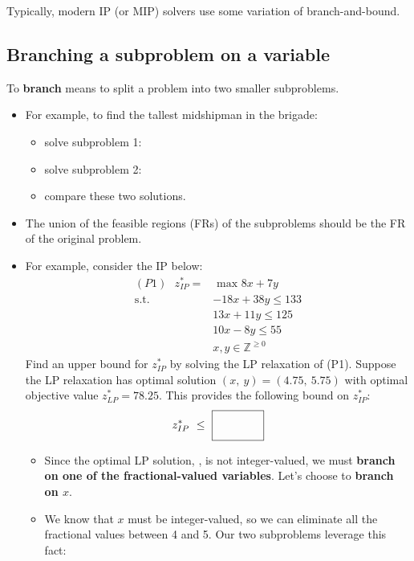 \documentclass[11pt]{article}
\theoremstyle{definition}
\newcommand{\answerbox}[3]{%
  \fbox{%
    \begin{minipage}[#1]{#2}
      \hfill\vspace{#3}
    \end{minipage}
  }
}
\newcommand{\wordbox}{\answerbox{c}{1.2in}{.7cm}}
\newcommand{\catbox}{\answerbox{c}{.5in}{.7cm}}
\begin{document}
Typically, modern IP (or MIP) solvers use some variation of branch-and-bound.
\vfill
\newpage
\subsection{Branching a subproblem on a variable}

To \textbf{branch} means to split a problem into two smaller subproblems. 

\begin{itemize}
\item For example, to find the tallest midshipman in the brigade:
\begin{itemize}
\item solve subproblem 1:  \answerbox{c}{10cm}{.7cm}
\item solve subproblem 2:  \answerbox{c}{10cm}{.7cm}
\item compare these two solutions.
\end{itemize}

\item  The union of the feasible regions (FRs) of the subproblems should be \wordbox the FR of the original problem.
\item For example, consider the IP below:
    \begin{align*}
    (P1) ~~~ z_{IP}^* = & \text{ max } 8x + 7y\\
      \text{s.t.} \quad & -18x + 38y \leq 133\\
                       & 13x + 11y \leq 125\\
                       & 10x -    8y \leq 55\\
                       & x, y \in \mathbb{Z}^{\geq 0}
    \end{align*}
Find an upper bound for $z_{IP}^*$ by solving the LP relaxation of (P1).  Suppose the LP relaxation has optimal solution $(x, ~y) =  (4.75, ~5.75)$ with optimal objective value $z^*_{LP} = 78.25$.  This provides the following bound on $z_{IP}^*$:
\[ z^*_{IP} ~\leq~ \catbox \]

\bigskip
\begin{itemize}
	\item Since the optimal LP solution, \underline{\hspace{3cm}}, is not integer-valued, we must \textbf{branch on one of the fractional-valued variables}.  Let's choose to \textbf{branch on $x$}.
 	\item  We know that $x$ must be integer-valued, so we can eliminate all the fractional values between 4 and 5.  Our two subproblems leverage this fact:
\end{itemize}


\end{itemize}
\end{document}
